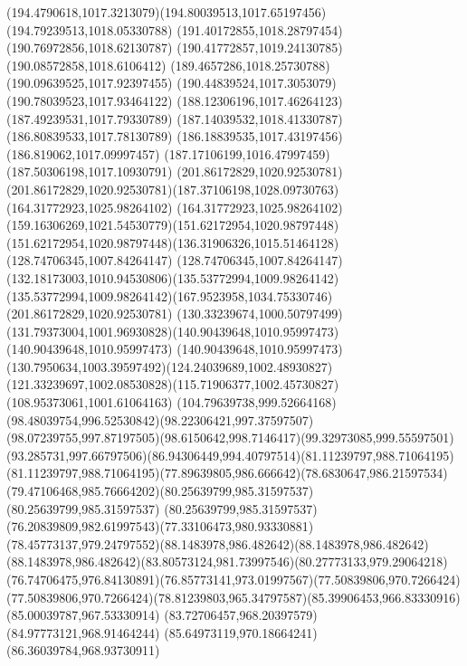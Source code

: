 {{		\curveto(194.4790618,1017.3213079)(194.80039513,1017.65197456)(194.79239513,1018.05330788)
		\moveto(191.40172855,1018.28797454)
		\lineto(190.76972856,1018.62130787)
		\lineto(190.41772857,1019.24130785)
		\lineto(190.08572858,1018.6106412)
		\lineto(189.4657286,1018.25730788)
		\lineto(190.09639525,1017.92397455)
		\lineto(190.44839524,1017.3053079)
		\lineto(190.78039523,1017.93464122)
		\closepath
		\moveto(188.12306196,1017.46264123)
		\lineto(187.49239531,1017.79330789)
		\lineto(187.14039532,1018.41330787)
		\lineto(186.80839533,1017.78130789)
		\lineto(186.18839535,1017.43197456)
		\lineto(186.819062,1017.09997457)
		\lineto(187.17106199,1016.47997459)
		\lineto(187.50306198,1017.10930791)
		\closepath
		\moveto(201.86172829,1020.92530781)
		\curveto(201.86172829,1020.92530781)(187.37106198,1028.09730763)(164.31772923,1025.98264102)
		\curveto(164.31772923,1025.98264102)(159.16306269,1021.54530779)(151.62172954,1020.98797448)
		\curveto(151.62172954,1020.98797448)(136.31906326,1015.51464128)(128.74706345,1007.84264147)
		\curveto(128.74706345,1007.84264147)(132.18173003,1010.94530806)(135.53772994,1009.98264142)
		\curveto(135.53772994,1009.98264142)(167.9523958,1034.75330746)(201.86172829,1020.92530781)
		\moveto(130.33239674,1000.50797499)
		\curveto(131.79373004,1001.96930828)(140.90439648,1010.95997473)(140.90439648,1010.95997473)
		\curveto(140.90439648,1010.95997473)(130.7950634,1003.39597492)(124.24039689,1002.48930827)
		\curveto(121.33239697,1002.08530828)(115.71906377,1002.45730827)(108.95373061,1001.61064163)
		\curveto(104.79639738,999.52664168)(98.48039754,996.52530842)(98.22306421,997.37597507)
		\curveto(98.07239755,997.87197505)(98.6150642,998.7146417)(99.32973085,999.55597501)
		\curveto(93.285731,997.66797506)(86.94306449,994.40797514)(81.11239797,988.71064195)
		\curveto(81.11239797,988.71064195)(77.89639805,986.666642)(78.6830647,986.21597534)
		\curveto(79.47106468,985.76664202)(80.25639799,985.31597537)(80.25639799,985.31597537)
		\curveto(80.25639799,985.31597537)(76.20839809,982.61997543)(77.33106473,980.93330881)
		\curveto(78.45773137,979.24797552)(88.1483978,986.482642)(88.1483978,986.482642)
		\curveto(88.1483978,986.482642)(83.80573124,981.73997546)(80.27773133,979.29064218)
		\curveto(76.74706475,976.84130891)(76.85773141,973.01997567)(77.50839806,970.7266424)
		\curveto(77.50839806,970.7266424)(78.81239803,965.34797587)(85.39906453,966.83330916)
		\lineto(85.00039787,967.53330914)
		\lineto(83.72706457,968.20397579)
		\lineto(84.97773121,968.91464244)
		\lineto(85.64973119,970.18664241)
		\lineto(86.36039784,968.93730911)
}}
